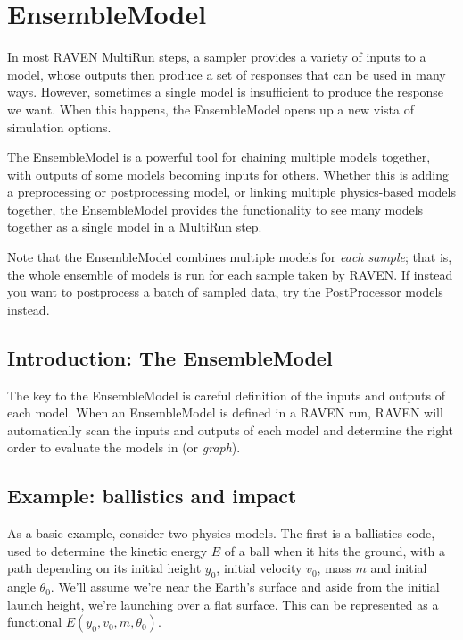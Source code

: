 \section{EnsembleModel}
\label{sec:ensembleModel}

In most RAVEN MultiRun steps, a sampler provides a variety of inputs to a model, whose outputs then produce a
set of responses that can be used in many ways.  However, sometimes a single model is insufficient to produce
the response we want.  When this happens, the EnsembleModel opens up a new vista of simulation options.

The EnsembleModel is a powerful tool for chaining multiple models together, with outputs of some models
becoming inputs for others.  Whether this is adding a preprocessing or postprocessing model, or linking
multiple physics-based models together, the EnsembleModel provides the functionality to see many models
together as a single model in a MultiRun step.

Note that the EnsembleModel combines multiple models for \emph{each sample}; that is, the whole ensemble of
models is run for each sample taken by RAVEN.  If instead you want to postprocess a batch of sampled data, try
the PostProcessor models instead.

\subsection{Introduction: The EnsembleModel}
The key to the EnsembleModel is careful definition of the inputs and outputs of each model.  When an
EnsembleModel is defined in a RAVEN run, RAVEN will automatically scan the inputs and outputs of each model
and determine the right order to evaluate the models in (or \emph{graph}).

\subsection{Example: ballistics and impact}
As a basic example, consider two physics models.  The first is a ballistics code, used to determine the
kinetic energy $E$ of a ball when it hits the ground, with a path depending on its initial height $y_0$, initial velocity
$v_0$, mass $m$ and initial angle $\theta_0$.  We'll assume we're near the Earth's surface and aside from the initial
launch height, we're launching over a flat surface.  This can be represented as a functional $E(y_0,v_0,m,\theta_0)$.

